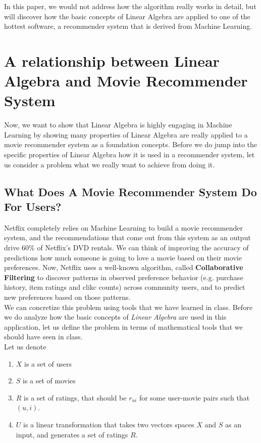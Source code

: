 \documentclass[paper=a4, fontsize=12pt]{scrartcl} %
\numberwithin{equation}{section} %
\numberwithin{figure}{section} %
\numberwithin{table}{section} %
\begin{document}
In this paper, we would not address how the algorithm really works in detail,
but will discover how the basic concepts of Linear Algebra are
applied to one of the hottest software, a recommender system that is derived
from Machine Learning.

\section{A relationship between Linear Algebra and Movie Recommender System}

Now, we want to show that Linear Algebra is highly engaging in Machine Learning
by showing many properties of Linear Algebra are really  applied to a movie
recommender system as a foundation concepts. Before we do jump into the specific
properties of Linear Algebra how it is used in a recommender system,
let us consider a problem what we really want to achieve from doing it.

\bigskip

\subsection{What Does A Movie Recommender System Do For Users?}

Netflix completely relies on Machine Learning to build a movie recommender system, and
the recommendations that come out from this system as an output drive \(60\%\)
of Netflix's DVD rentals. We can think of improving the accuracy of predictions
how much someone is going to love a movie based on their movie preferences.
Now, Netflix uses a well-known algorithm, called \textbf{Collaborative Filtering} to discover
patterns in observed preference behavior (e.g. purchase history, item ratings and clikc counts) across
community users, and to predict new preferences based on those patterns. \\

We can concretize this problem using tools that we have learned in class.
Before we do analyze how the basic concepts of \textit{Linear Algebra} are used in this application,
let us define the problem in terms of mathematical tools that we should have seen
in class. \\

Let us denote

\begin{enumerate}
	\item \(X\) is a set of users
	\item \(S\) is a set of movies
  \item \(R\) is a set of ratings, that should be \(r_{ui}\) for some user-movie
    pairs such that \((u,i)\).
  \item \(U\) is a linear transformation that takes two vectors spaces \(X\) and
    \(S\) as an input, and generates a set of ratings \(R\).
  \end{enumerate}
\end{document}
